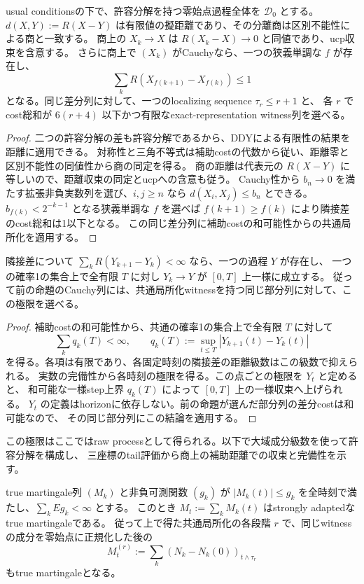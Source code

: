 \begin{proposition}[分解可能過程の商上の距離とCauchy列]
usual conditionsの下で、許容分解を持つ零始点過程全体を $\mathcal D_0$ とする。
$d(X,Y):=R(X-Y)$ は有限値の擬距離であり、その分離商は区別不能性による商と一致する。
商上の $X_k\to X$ は $R(X_k-X)\to0$ と同値であり、ucp収束を含意する。
さらに商上で $(X_k)$ がCauchyなら、一つの狭義単調な $f$ が存在し、
\[
 \sum_k R(X_{f(k+1)}-X_{f(k)})\le1
\]
となる。同じ差分列に対して、一つのlocalizing sequence $\tau_r\le r+1$ と、
各 $r$ でcost総和が $6(r+4)$ 以下かつ有限なexact-representation witness列を選べる。
\end{proposition}
\begin{proof}
二つの許容分解の差も許容分解であるから、DDYによる有限性の結果を距離に適用できる。
対称性と三角不等式は補助costの代数から従い、距離零と区別不能性の同値性から商の同定を得る。
商の距離は代表元の $R(X-Y)$ に等しいので、距離収束の同定とucpへの含意も従う。
Cauchy性から $b_n\to0$ を満たす拡張非負実数列を選び、$i,j\ge n$ なら
$d(X_i,X_j)\le b_n$ とできる。$b_{f(k)}<2^{-k-1}$ となる狭義単調な $f$ を選べば
$f(k+1)\ge f(k)$ により隣接差のcost総和は1以下となる。
この同じ差分列に補助costの和可能性からの共通局所化を適用する。
\end{proof}
\begin{lemma}[同じ部分列の局所一様極限]
隣接差について $\sum_k R(Y_{k+1}-Y_k)<\infty$ なら、一つの過程 $Y$ が存在し、
一つの確率1の集合上で全有限 $T$ に対し $Y_k\to Y$ が $[0,T]$ 上一様に成立する。
従って前の命題のCauchy列には、共通局所化witnessを持つ同じ部分列に対して、この極限を選べる。
\end{lemma}
\begin{proof}
補助costの和可能性から、共通の確率1の集合上で全有限 $T$ に対して
\[
 \sum_k q_k(T)<\infty,\qquad
 q_k(T):=\sup_{t\le T}|Y_{k+1}(t)-Y_k(t)|
\]
を得る。各項は有限であり、各固定時刻の隣接差の距離級数はこの級数で抑えられる。
実数の完備性から各時刻の極限を得る。この点ごとの極限を $Y_t$ と定めると、
和可能な一様step上界 $q_k(T)$ によって $[0,T]$ 上の一様収束へ上げられる。
$Y_t$ の定義はhorizonに依存しない。前の命題が選んだ部分列の差分costは和可能なので、
その同じ部分列にこの結論を適用する。
\end{proof}
この極限はここではraw processとして得られる。以下で大域成分級数を使って許容分解を構成し、
三座標のtail評価から商上の補助距離での収束と完備性を示す。
\begin{lemma}[固定停止段階のマルチンゲール成分の和]
true martingale列 $(M_k)$ と非負可測関数 $(g_k)$ が
$|M_k(t)|\le g_k$ を全時刻で満たし、$\sum_k E g_k<\infty$ とする。
このとき $M_t:=\sum_k M_k(t)$ はstrongly adaptedなtrue martingaleである。
従って上で得た共通局所化の各段階 $r$ で、同じwitnessの成分を零始点に正規化した後の
\[
 M^{(r)}_t:=\sum_k (N_k-N_k(0))_{t\wedge\tau_r}
\]
もtrue martingaleとなる。
\end{lemma}

